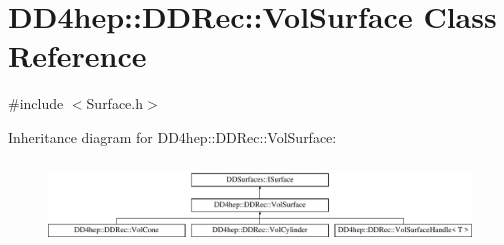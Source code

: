 \hypertarget{class_d_d4hep_1_1_d_d_rec_1_1_vol_surface}{}\section{D\+D4hep\+:\+:D\+D\+Rec\+:\+:Vol\+Surface Class Reference}
\label{class_d_d4hep_1_1_d_d_rec_1_1_vol_surface}


{\ttfamily \#include $<$Surface.\+h$>$}

Inheritance diagram for D\+D4hep\+:\+:D\+D\+Rec\+:\+:Vol\+Surface\+:\begin{figure}[H]
\begin{center}
\leavevmode
\includegraphics[height=2.213439cm]{class_d_d4hep_1_1_d_d_rec_1_1_vol_surface}
\end{center}
\end{figure}
